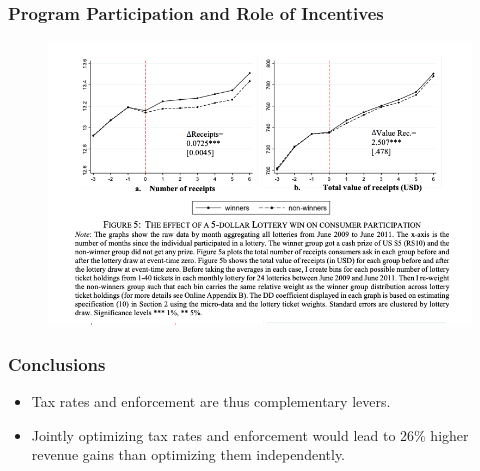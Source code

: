 \documentclass{beamer}
\begin{document}
\begin{frame}
\frametitle{Program Participation and Role of Incentives}
\begin{figure}
    \centering
    \includegraphics[width=\textwidth]{Paper Presentations/Consumers as Tax Auditors/F5.png}
\end{figure}
\end{frame}

\begin{frame}
\frametitle{Conclusions}
\begin{itemize}
\item Tax rates and enforcement are thus complementary levers. 
\item Jointly optimizing tax rates and
enforcement would lead to 26\% higher revenue gains than optimizing them independently.
\end{itemize}
\end{frame}
\end{document}
